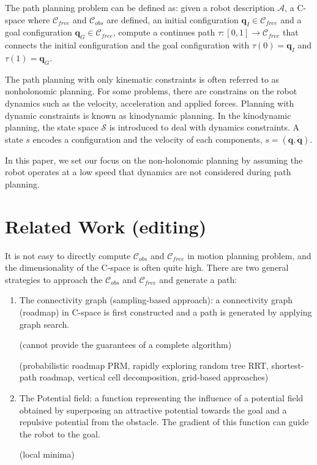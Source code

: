 \documentclass[letterpaper, 12 pt, conference]{ieeeconf}  %
\begin{document}
The path planning problem can be defined as: given a robot description $\mathcal{A}$, a C-space where $\mathcal{C}_{free}$ and $\mathcal{C}_{obs}$ are defined, an initial configuration $\textbf{q}_{I}\in \mathcal{C}_{free}$ and a goal configuration $\textbf{q}_{G} \in \mathcal{C}_{free}$, compute a continues path $\tau:\left [ 0,1 \right ]\rightarrow \mathcal{C}_{free}$ that connects the initial configuration and the goal configuration with $\tau(0)=\textbf{q}_{I}$ and $\tau(1)=\textbf{q}_{G}$. 

The path planning with only kinematic constraints is often referred to as nonholonomic planning. 
For some problems, there are constrains on the robot dynamics such as the velocity, acceleration and applied forces. Planning with dynamic constraints is known as kinodynamic planning. 
In the kinodynamic planning, the state space $\mathcal{S}$ is introduced to deal with dynamics constraints. A state $s$ encodes a configuration and the velocity of each components, $s = (\textbf{q}, \dot{\textbf{q}})$.

In this paper, we set our focus on the non-holonomic planning by assuming the robot operates at a low speed that dynamics are not considered during path planning. 

\section{Related Work (editing)}
It is not easy to directly compute $\mathcal{C}_{obs}$ and $\mathcal{C}_{free}$ in motion planning problem, and the dimensionality of the C-space is often quite high. There are two general strategies to approach the $\mathcal{C}_{obs}$ and $\mathcal{C}_{free}$ and generate a path:
\begin{enumerate}
\item The connectivity graph (sampling-based approach): a connectivity graph (roadmap) in C-space is first constructed and a path is generated by applying graph search.

(cannot provide the guarantees of a complete algorithm)

(probabilistic roadmap PRM, rapidly exploring random tree RRT, shortest-path roadmap, vertical cell decomposition, grid-based approaches)
\item The Potential field: a function representing the influence of a potential field obtained by superposing an attractive potential towards the goal and a repulsive potential from the obstacle. The gradient of this function can guide the robot to the goal. 

(local minima)
\end{enumerate}
\end{document}
